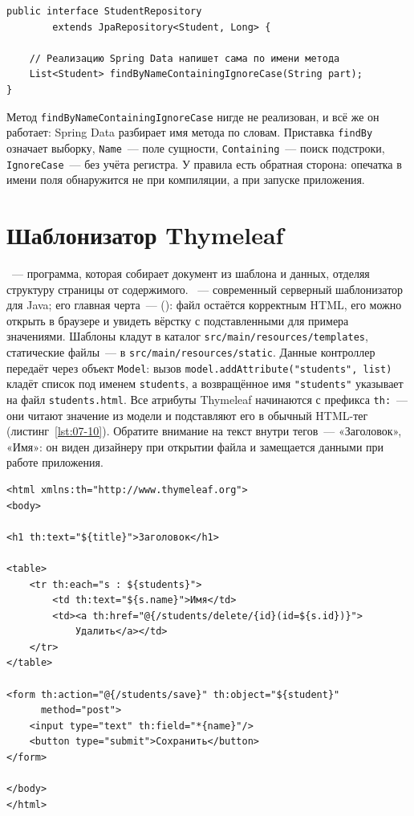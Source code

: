 \begin{listing}[H]
\begin{verbatim}
public interface StudentRepository
        extends JpaRepository<Student, Long> {

    // Реализацию Spring Data напишет сама по имени метода
    List<Student> findByNameContainingIgnoreCase(String part);
}
\end{verbatim}
\caption{Репозиторий Spring Data JPA}
\label{lst:07-9}
\end{listing}

Метод \texttt{findByNameContainingIgnoreCase} нигде не реализован, и всё же он
работает: Spring Data разбирает имя метода по словам. Приставка
\texttt{findBy} означает выборку, \texttt{Name}~--- поле сущности,
\texttt{Containing}~--- поиск подстроки, \texttt{IgnoreCase}~--- без учёта
регистра. У правила есть обратная сторона: опечатка в имени поля обнаружится
не при компиляции, а при запуске приложения.

\section{Шаблонизатор Thymeleaf}

~--- программа, которая собирает документ из шаблона и
данных, отделяя структуру страницы от содержимого. ~---
современный серверный шаблонизатор для Java; его главная черта~---
 (): файл остаётся
корректным HTML, его можно открыть в браузере и увидеть вёрстку с
подставленными для примера значениями. Шаблоны кладут
в каталог \texttt{src/main/resources/templates}, статические файлы~--- в
\texttt{src/main/resources/static}. Данные контроллер передаёт через объект
\texttt{Model}: вызов \texttt{model.addAttribute("students", list)} кладёт
список под именем \texttt{students}, а возвращённое имя \texttt{"students"}
указывает на файл \texttt{students.html}. Все атрибуты Thymeleaf начинаются с
префикса \texttt{th:}~--- они читают значение из модели и подставляют его в
обычный HTML-тег (листинг~\ref{lst:07-10}). Обратите внимание на текст внутри
тегов~--- «Заголовок», «Имя»: он виден дизайнеру при открытии файла и
замещается данными при работе приложения.

\begin{listing}[H]
\begin{verbatim}
<html xmlns:th="http://www.thymeleaf.org">
<body>

<h1 th:text="${title}">Заголовок</h1>

<table>
    <tr th:each="s : ${students}">
        <td th:text="${s.name}">Имя</td>
        <td><a th:href="@{/students/delete/{id}(id=${s.id})}">
            Удалить</a></td>
    </tr>
</table>

<form th:action="@{/students/save}" th:object="${student}"
      method="post">
    <input type="text" th:field="*{name}"/>
    <button type="submit">Сохранить</button>
</form>

</body>
</html>
\end{verbatim}
\caption{Шаблон Thymeleaf: вывод, цикл, ссылка и форма}
\label{lst:07-10}
\end{listing}

